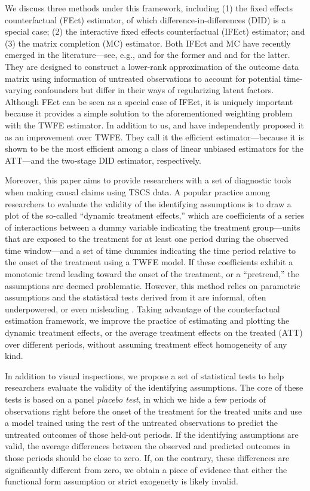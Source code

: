 \documentclass[12pt]{article}
\begin{document}
We discuss three methods under this framework, including (1) the fixed effects counterfactual (FEct) estimator, of which difference-in-differences (DID) is a special case; (2) the interactive fixed effects counterfactual (IFEct) estimator; and (3) the matrix completion (MC) estimator. Both IFEct and MC have recently emerged in the literature---see, e.g., \citet{GobillonMagnac2016} and \citet{xu2017generalized} for the former and \citet{kidzinski2018longitudinal} and \citet{athey2018matrix} for the latter. They are designed to construct a lower-rank approximation of the outcome data matrix using information of untreated observations to account for potential time-varying confounders but differ in their ways of regularizing latent factors. Although FEct can be seen as a special case of IFEct, it is uniquely important because it provides a simple solution to the aforementioned weighting problem with the TWFE estimator. In addition to us, \citet{borusyak2020revisiting} and \citet{gardnertwo} have independently proposed it as an improvement over TWFE. They call it the efficient estimator---because it is shown to be the most efficient among a class of linear unbiased estimators for the ATT---and the two-stage DID estimator, respectively.  

Moreover, this paper aims to provide researchers with a set of diagnostic tools when making causal claims using TSCS data. A popular practice among researchers to evaluate the validity of the identifying assumptions is to draw a plot of the so-called ``dynamic treatment effects,'' which are coefficients of a series of interactions between a dummy variable indicating the treatment group---units that are exposed to the treatment for at least one period during the observed time window---and a set of time dummies indicating the time period relative to the onset of the treatment using a TWFE model. If these coefficients exhibit a monotonic trend leading toward the onset of the treatment, or a ``pretrend,'' the assumptions are deemed problematic. However, this method relies on parametric assumptions and the statistical tests derived from it are informal, often underpowered, or even misleading \citep{Roth2020,sun2020estimating}. Taking advantage of the counterfactual estimation framework, we improve the practice of estimating and plotting the dynamic treatment effects, or the average treatment effects on the treated (ATT) over different periods, without assuming treatment effect homogeneity of any kind. 

In addition to visual inspections, we propose a set of statistical tests to help researchers evaluate the validity of the identifying assumptions. The core of these tests is based on a panel \emph{placebo test}, in which we hide a few periods of observations right before the onset of the treatment for the treated units and use a model trained using the rest of the untreated observations to predict the untreated outcomes of those held-out periods. If the identifying assumptions are valid, the average differences between the observed and predicted outcomes in those periods should be close to zero. If, on the contrary, these differences are significantly different from zero, we obtain a piece of evidence that either the functional form assumption or strict exogeneity is likely invalid. 
\end{document}
